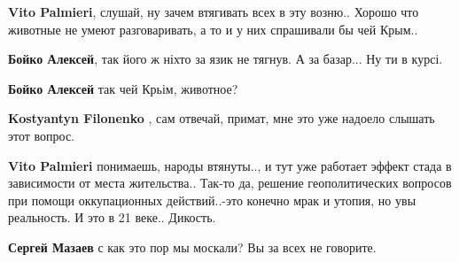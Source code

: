 \begin{itemize}
\begin{itemize}
\textbf{Vito Palmieri}, слушай, ну зачем втягивать всех в эту возню..
Хорошо что животные не умеют разговаривать, а то и у них спрашивали бы чей Крым..

 
\textbf{Бойко Алексей}, так його ж ніхто за язик не тягнув.
А за базар... Ну ти в курсі.

 
\textbf{Бойко Алексей} так чей Крьім, животное?

 
\textbf{Kostyantyn Filonenko} , сам отвечай, примат, мне это уже надоело слышать этот вопрос.

 
\textbf{Vito Palmieri} понимаешь, народы втянуты.., и тут уже работает эффект стада в зависимости от места жительства..
Так-то да, решение геополитических вопросов при помощи оккупационных действий..-это конечно мрак и утопия, но увы реальность. И это в 21 веке.. Дикость.
\end{itemize}

 
\textbf{Сергей Мазаев} с как это пор мы москали? Вы за всех не говорите.

 

\end{itemize}
